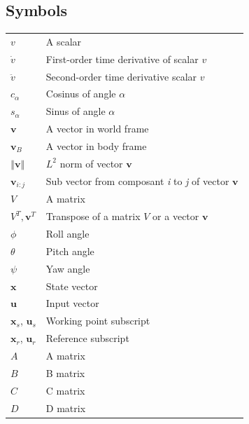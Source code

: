 \documentclass[a4paper, 12pt]{report}
\begin{document}
\subsection*{Symbols}
\begin{table}[h]
\centering
\begin{tabular}{p{8cm} p{8cm}}
$v$ \dotfill & A scalar \\
$\dot v$ \dotfill & First-order time derivative of scalar $v$ \\
$ \ddot v$ \dotfill & Second-order time derivative scalar $v$\\
$c_{\alpha}$ \dotfill & Cosinus of angle $\alpha$ \\
$s_{\alpha}$ \dotfill & Sinus of angle $\alpha$ \\
$\boldsymbol{v}$ \dotfill & A vector in world frame \\
$\boldsymbol{v}_B$ \dotfill & A vector in body frame \\
$\left\Vert \boldsymbol{v} \right\Vert$ \dotfill & $L^2$ norm of vector $\boldsymbol{v}$ \\
$\boldsymbol{v}_{i:j}$ \dotfill & Sub vector from composant \emph{i} to \emph{j} of vector $\boldsymbol{v}$\\
$V$ \dotfill & A matrix \\
$V^T,\boldsymbol{v}^T$ \dotfill & Transpose of a matrix $V$ or a vector $\boldsymbol{v}$ \\
$\phi$ \dotfill & Roll angle \\
$\theta$ \dotfill & Pitch angle \\
$\psi$ \dotfill & Yaw angle \\
$\boldsymbol{x}$ \dotfill & State vector \\
$\boldsymbol{u}$ \dotfill & Input vector \\
$\boldsymbol{x}_s$, $\boldsymbol{u}_s$ \dotfill & Working point subscript \\
$\boldsymbol{x}_r$, $\boldsymbol{u}_r$ \dotfill & Reference subscript \\
$A$ \dotfill & A matrix \\
$B$ \dotfill & B matrix \\
$C$ \dotfill & C matrix \\
$D$ \dotfill & D matrix \\
\end{tabular}
\end{table}
\end{document}
